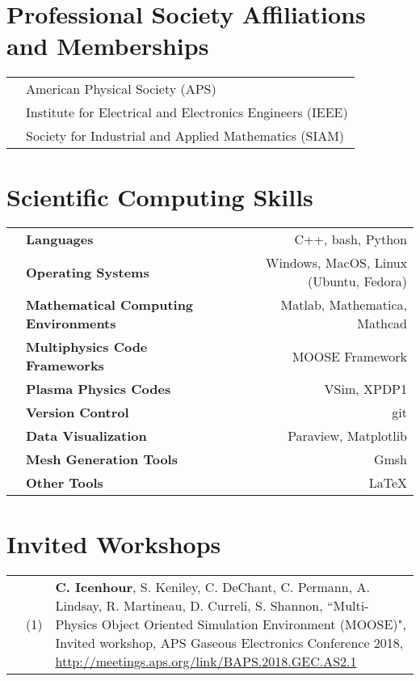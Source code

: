 \documentclass{article}
\begin{document}
\section*{Professional Society Affiliations and Memberships}

\begin{tabularx}{\textwidth}{l l}
	\hspace{2em} & American Physical Society (APS) \\
				 & Institute for Electrical and Electronics Engineers (IEEE) \\
				 & Society for Industrial and Applied Mathematics (SIAM)
\end{tabularx}

\section*{Scientific Computing Skills}

	\begin{tabularx}{\textwidth}{l X r}
		\hspace {2em} & \textbf{Languages} & C++, bash, Python \\
					  & \textbf{Operating Systems} & Windows, MacOS, Linux (Ubuntu, Fedora) \\
					  & \textbf{Mathematical Computing Environments} & Matlab, Mathematica, Mathcad \\
					  & \textbf{Multiphysics Code Frameworks} & MOOSE Framework \\
					  & \textbf{Plasma Physics Codes} & VSim, XPDP1 \\
					  & \textbf{Version Control} & git \\
					  & \textbf{Data Visualization} & Paraview, Matplotlib \\
					  & \textbf{Mesh Generation Tools} & Gmsh \\
					  & \textbf{Other Tools} & \LaTeX
	\end{tabularx}

\section*{Invited Workshops}

	\begin{tabularx}{\textwidth}{l l X}
		\hspace{2em}
			& (1)  & \textbf{C. Icenhour}, S. Keniley, C. DeChant, C. Permann, A. Lindsay, R. Martineau, D. Curreli, S. Shannon, ``Multi-Physics Object Oriented Simulation Environment (MOOSE)", Invited workshop, APS Gaseous Electronics Conference 2018, \url{http://meetings.aps.org/link/BAPS.2018.GEC.AS2.1}
	\end{tabularx}
\end{document}
